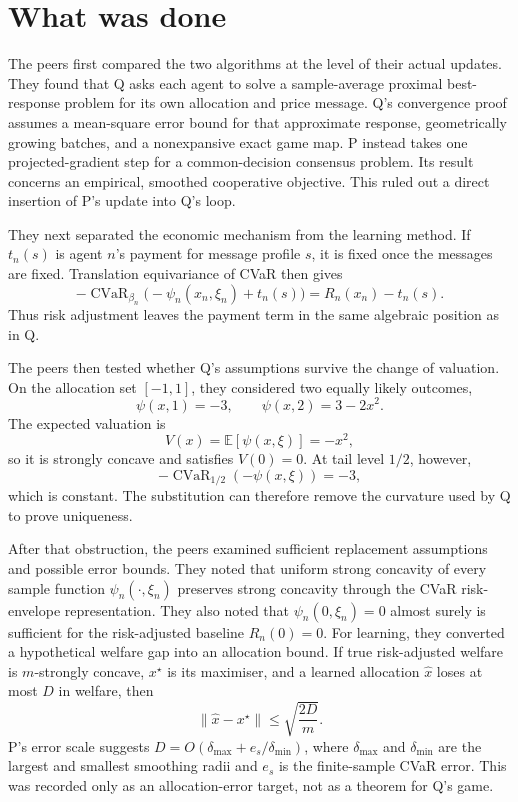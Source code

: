 \documentclass{article}
\begin{document}
\section{What was done}

The peers first compared the two algorithms at the level of their actual updates. They found that Q asks each agent to solve a sample-average proximal best-response problem for its own allocation and price message. Q's convergence proof assumes a mean-square error bound for that approximate response, geometrically growing batches, and a nonexpansive exact game map. P instead takes one projected-gradient step for a common-decision consensus problem. Its result concerns an empirical, smoothed cooperative objective. This ruled out a direct insertion of P's update into Q's loop.

They next separated the economic mechanism from the learning method. If \(t_n(s)\) is agent \(n\)'s payment for message profile \(s\), it is fixed once the messages are fixed. Translation equivariance of CVaR then gives
\[
-\operatorname{CVaR}_{\beta_n}
  \bigl(-\psi_n(x_n,\xi_n)+t_n(s)\bigr)
=R_n(x_n)-t_n(s).
\]
Thus risk adjustment leaves the payment term in the same algebraic position as in Q.

The peers then tested whether Q's assumptions survive the change of valuation. On the allocation set \([-1,1]\), they considered two equally likely outcomes,
\[
\psi(x,1)=-3,
\qquad
\psi(x,2)=3-2x^2.
\]
The expected valuation is
\[
V(x)=\mathbb{E}[\psi(x,\xi)]=-x^2,
\]
so it is strongly concave and satisfies \(V(0)=0\). At tail level \(1/2\), however,
\[
-\operatorname{CVaR}_{1/2}(-\psi(x,\xi))=-3,
\]
which is constant. The substitution can therefore remove the curvature used by Q to prove uniqueness.

After that obstruction, the peers examined sufficient replacement assumptions and possible error bounds. They noted that uniform strong concavity of every sample function \(\psi_n(\mathord{\cdot},\xi_n)\) preserves strong concavity through the CVaR risk-envelope representation. They also noted that \(\psi_n(0,\xi_n)=0\) almost surely is sufficient for the risk-adjusted baseline \(R_n(0)=0\). For learning, they converted a hypothetical welfare gap into an allocation bound. If true risk-adjusted welfare is \(m\)-strongly concave, \(x^\star\) is its maximiser, and a learned allocation \(\widehat{x}\) loses at most \(D\) in welfare, then
\[
\lVert \widehat{x}-x^\star\rVert
\leq \sqrt{\frac{2D}{m}}.
\]
P's error scale suggests \(D=O(\delta_{\max}+e_s/\delta_{\min})\), where \(\delta_{\max}\) and \(\delta_{\min}\) are the largest and smallest smoothing radii and \(e_s\) is the finite-sample CVaR error. This was recorded only as an allocation-error target, not as a theorem for Q's game.
\end{document}
